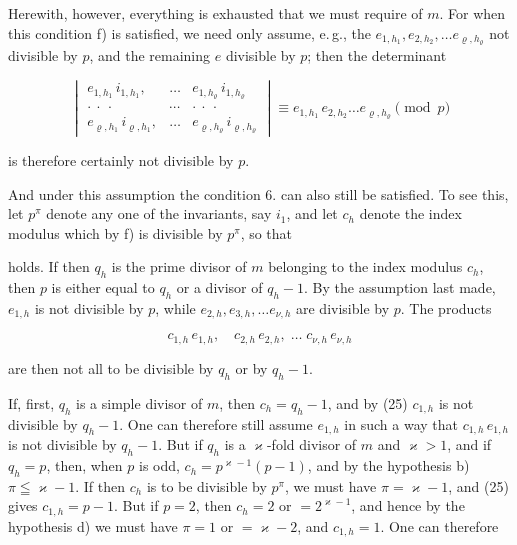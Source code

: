 
Herewith, however, everything is exhausted that we must require of $m$. For
when this condition f) is satisfied, we need only assume, e.\,g., the
$e_{1,h_1}, e_{2,h_2}, \dots e_{\varrho,h_\varrho}$ not divisible by $p$,
and the remaining $e$ divisible by $p$; then the determinant

\[
\begin{vmatrix}
e_{1,h_1}\,i_{1,h_1}, & \dots & e_{1,h_\varrho}\,i_{1,h_\varrho} \\
\cdot\ \cdot\ \cdot & \cdots & \cdot\ \cdot\ \cdot \\
e_{\varrho,h_1}\,i_{\varrho,h_1}, & \dots & e_{\varrho,h_\varrho}\,i_{\varrho,h_\varrho}
\end{vmatrix}
\equiv e_{1,h_1}\,e_{2,h_2} \dots e_{\varrho,h_\varrho} \pmod{p}
\]

is therefore certainly not divisible by $p$.

And under this assumption the condition 6. can also still be satisfied.
To see this, let $p^\pi$ denote any one of the invariants, say $i_1$, and
let $c_h$ denote the index modulus which by f) is divisible by $p^\pi$,
so that


holds. If then $q_h$ is the prime divisor of $m$ belonging to the index
modulus $c_h$, then $p$ is either equal to $q_h$ or a divisor of $q_h - 1$.
By the assumption last made, $e_{1,h}$ is not divisible by $p$, while
$e_{2,h}, e_{3,h}, \dots e_{\nu,h}$ are divisible by $p$. The products

\[
c_{1,h}\,e_{1,h}, \quad c_{2,h}\,e_{2,h}, \; \dots \; c_{\nu,h}\,e_{\nu,h}
\]

are then not all to be divisible by $q_h$ or by $q_h - 1$.

If, first, $q_h$ is a simple divisor of $m$, then $c_h = q_h -
1$, and by (25) $c_{1,h}$ is not divisible by $q_h - 1$. One can
therefore still assume $e_{1,h}$ in such a way that $c_{1,h}\,e_{1,h}$ is not divisible by
$q_h - 1$. But if $q_h$ is a $\varkappa$-fold divisor of
$m$ and $\varkappa > 1$, and if $q_h = p$, then, when $p$ is odd,
$c_h = p^{\varkappa - 1}(p-1)$, and by the hypothesis b)
$\pi \leqq \varkappa - 1$. If then $c_h$ is to be divisible by $p^\pi$,
we must have $\pi = \varkappa - 1$, and (25) gives $c_{1,h} =
p - 1$. But if $p = 2$, then $c_h = 2$ or $= 2^{\varkappa - 1}$,
and hence by the hypothesis d) we must have $\pi = 1$ or $= \varkappa -
2$, and $c_{1,h} = 1$. One can therefore

